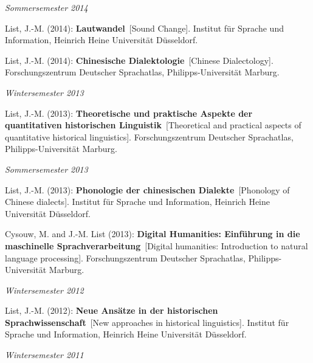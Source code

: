 \noindent\textit{Sommersemester 2014}\par\nopagebreak\vspace{0.25cm}
\nopagebreak\noindent List, J.-M. (2014): \textbf{Lautwandel}\ [Sound Change]. Institut für Sprache und Information, Heinrich Heine Universität Düsseldorf.\vspace{0.25cm}
\par
\nopagebreak\noindent List, J.-M. (2014): \textbf{Chinesische Dialektologie}\ [Chinese Dialectology]. Forschungszentrum Deutscher Sprachatlas, Philipps-Universität Marburg.\vspace{0.25cm}
\par
\noindent\textit{Wintersemester 2013}\par\nopagebreak\vspace{0.25cm}
\nopagebreak\noindent List, J.-M. (2013): \textbf{Theoretische und praktische Aspekte der quantitativen historischen Linguistik}\ [Theoretical and practical aspects of quantitative historical linguistics]. Forschungszentrum Deutscher Sprachatlas, Philipps-Universität Marburg.\vspace{0.25cm}
\par
\noindent\textit{Sommersemester 2013}\par\nopagebreak\vspace{0.25cm}
\nopagebreak\noindent List, J.-M. (2013): \textbf{Phonologie der chinesischen Dialekte}\ [Phonology of Chinese dialects]. Institut für Sprache und Information, Heinrich Heine Universität Düsseldorf.\vspace{0.25cm}
\par
\nopagebreak\noindent Cysouw, M. and J.-M. List (2013): \textbf{Digital Humanities: Einführung in die maschinelle Sprachverarbeitung}\ [Digital humanities: Introduction to natural language processing]. Forschungszentrum Deutscher Sprachatlas, Philipps-Universität Marburg.\vspace{0.25cm}
\par
\noindent\textit{Wintersemester 2012}\par\nopagebreak\vspace{0.25cm}
\nopagebreak\noindent List, J.-M. (2012): \textbf{Neue Ansätze in der historischen Sprachwissenschaft}\ [New approaches in historical linguistics]. Institut für Sprache und Information, Heinrich Heine Universität Düsseldorf.\vspace{0.25cm}
\par
\noindent\textit{Wintersemester 2011}\par\nopagebreak\vspace{0.25cm}

